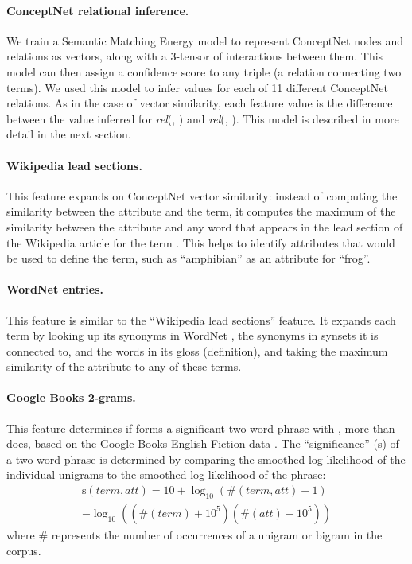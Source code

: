 \documentclass[11pt,a4paper]{article}
\begin{document}
\paragraph{ConceptNet relational inference.} We train a Semantic
Matching Energy model to represent ConceptNet nodes and relations as vectors,
along with a 3-tensor of interactions between them. This model can then assign
a confidence score to any triple (a relation connecting two terms). We used
this model to infer values for each of 11 different ConceptNet relations.  As
in the case of vector similarity, each feature value is the difference between
the value inferred for \emph{rel}(\termOne, \att) and \emph{rel}(\termTwo,
\att). This model is described in more detail in the next section.

\paragraph{Wikipedia lead sections.} This feature expands on ConceptNet vector
similarity: instead of computing the similarity between the attribute and the
term, it computes the maximum of the similarity between the attribute and any
word that appears in the lead section of the Wikipedia article for the term
\cite{wikipedia2017en}. This helps to identify attributes that would be used to
define the term, such as ``amphibian'' as an attribute for ``frog''.

\paragraph{WordNet entries.} This feature is similar to the ``Wikipedia lead
sections'' feature.  It expands each term by looking up its synonyms in WordNet
\cite{miller1998wordnet}, the synonyms in synsets it is connected to, and the
words in its gloss (definition), and taking the maximum similarity of the
attribute to any of these terms.

\paragraph{Google Books 2-grams.} This feature determines if \termOne{} forms a
significant two-word phrase with \att, more than \termTwo{} does, based on the
Google Books English Fiction data \cite{lin2012ngrams}.
The ``significance'' (s) of a two-word phrase is determined by comparing the
smoothed log-likelihood of the individual unigrams to the smoothed
log-likelihood of the phrase:
\begin{equation*}
    \begin{split}
        \mathrm{s}(\mathit{term}, \mathit{att}) = 10 + \log_{10}(\#(\mathit{term}, \mathit{att}) + 1)\\
        - \log_{10}((\#(\mathit{term}) + 10^5)(\#(\mathit{att}) + 10^5))
    \end{split}
\end{equation*}
where $\#$ represents the number of occurrences of a unigram or bigram in the corpus.
\end{document}
